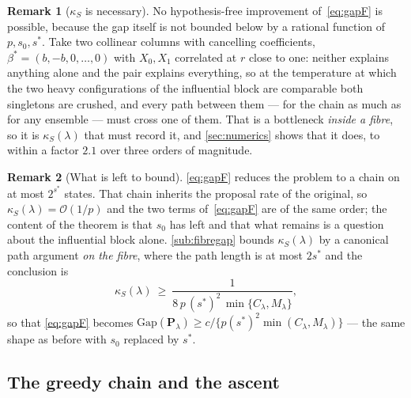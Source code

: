 \documentclass[aos]{imsart}
\newcommand{\OO}{\mathcal{O}}  %
\theoremstyle{plain}
\theoremstyle{definition}
\newtheorem{remark}{Remark}[section]
\begin{document}
    \begin{remark}[$\kappa_S$ is necessary]
        \label{rem:necessary}
        No hypothesis-free improvement of~\eqref{eq:gapF} is possible,
        because the gap itself is not bounded below by a rational function
        of $p,s_0,s^{\ast}$. Take two collinear columns with cancelling
        coefficients, $\beta^{\ast}=(b,-b,0,\dots,0)$ with $X_0,X_1$
        correlated at $r$ close to one: neither explains anything alone and
        the pair explains everything, so at the temperature at which the
        two heavy configurations of the influential block are comparable
        both singletons are crushed, and every path between them --- for the
        chain as much as for any ensemble --- must cross one of them. That
        is a bottleneck \emph{inside a fibre}, so it is $\kappa_S(\lambda)$
        that must record it, and \cref{sec:numerics} shows that it does, to
        within a factor $2.1$ over three orders of magnitude.
    \end{remark}

    \begin{remark}[What is left to bound]
        \label{rem:left}
        \eqref{eq:gapF} reduces the problem to a chain on at most
        $2^{s^{\ast}}$ states. That chain inherits the proposal rate of the
        original, so $\kappa_S(\lambda)=\OO(1/p)$ and the two terms
        of~\eqref{eq:gapF} are of the same order; the content of the theorem
        is that $s_0$ has left and that what remains is a question about the
        influential block alone. \cref{sub:fibregap} bounds
        $\kappa_S(\lambda)$ by a canonical path argument \emph{on the
        fibre}, where the path length is at most $2s^{\ast}$ and the
        conclusion is
        \begin{equation}
            \label{eq:kappapath}
            \kappa_S(\lambda)\ \geq\
            \frac{1}{8\,p\,(s^{\ast})^{2}\,
            \min\{C_\lambda,M_\lambda\}} ,
        \end{equation}
        so that \eqref{eq:gapF} becomes
        $\mathrm{Gap}(\mathbf{P}_\lambda)\geq c/\{p(s^{\ast})^{2}
        \min(C_\lambda,M_\lambda)\}$ --- the same shape as before with
        $s_0$ replaced by $s^{\ast}$.
    \end{remark}

    \subsection{The greedy chain and the ascent}
    \label{sub:eroute}
\end{document}
